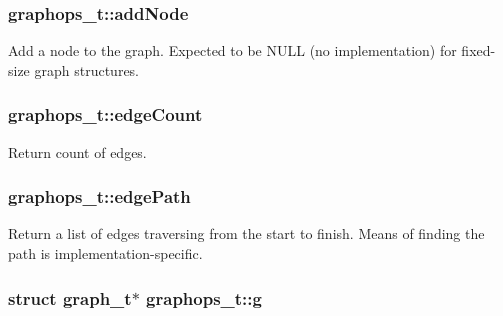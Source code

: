 \subsubsection[{\texorpdfstring{add\+Node}{addNode}}]{ graphops\+\_\+t\+::add\+Node}\hypertarget{structgraphops__t_aa1fdab76a86ab2889415964b51f1738f}{}\label{structgraphops__t_aa1fdab76a86ab2889415964b51f1738f}


Add a node to the graph. Expected to be N\+U\+LL (no implementation) for fixed-\/size graph structures. 

\subsubsection[{\texorpdfstring{edge\+Count}{edgeCount}}]{ graphops\+\_\+t\+::edge\+Count}\hypertarget{structgraphops__t_a5db6e2eee59ada7705fb54bf5f6b9ee1}{}\label{structgraphops__t_a5db6e2eee59ada7705fb54bf5f6b9ee1}


Return count of edges. 

\subsubsection[{\texorpdfstring{edge\+Path}{edgePath}}]{ graphops\+\_\+t\+::edge\+Path}\hypertarget{structgraphops__t_ab0fdace070db2a1fa199e920b6136a04}{}\label{structgraphops__t_ab0fdace070db2a1fa199e920b6136a04}


Return a list of edges traversing from the start to finish. Means of finding the path is implementation-\/specific. 

\subsubsection[{\texorpdfstring{g}{g}}]{\setlength{\rightskip}{0pt plus 5cm}struct {\bf graph\+\_\+t}$\ast$ graphops\+\_\+t\+::g}\hypertarget{structgraphops__t_ac78af00da8d2616ef3499a9632309316}{}\label{structgraphops__t_ac78af00da8d2616ef3499a9632309316}


